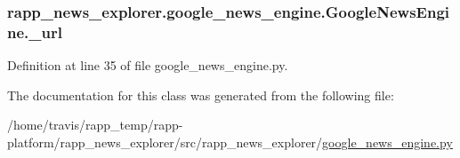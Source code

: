 \hypertarget{classrapp__news__explorer_1_1google__news__engine_1_1GoogleNewsEngine_a0ea605dfe67b44d3549af099a881d23b}{
\subsubsection[{\-\_\-url}]{\setlength{\rightskip}{0pt plus 5cm}rapp\-\_\-news\-\_\-explorer.\-google\-\_\-news\-\_\-engine.\-Google\-News\-Engine.\-\_\-url\hspace{0.3cm}{\ttfamily [private]}}}\label{classrapp__news__explorer_1_1google__news__engine_1_1GoogleNewsEngine_a0ea605dfe67b44d3549af099a881d23b}


Definition at line 35 of file google\-\_\-news\-\_\-engine.\-py.



The documentation for this class was generated from the following file\-:\begin{DoxyCompactItemize}
\item 
/home/travis/rapp\-\_\-temp/rapp-\/platform/rapp\-\_\-news\-\_\-explorer/src/rapp\-\_\-news\-\_\-explorer/\hyperlink{google__news__engine_8py}{google\-\_\-news\-\_\-engine.\-py}\end{DoxyCompactItemize}
